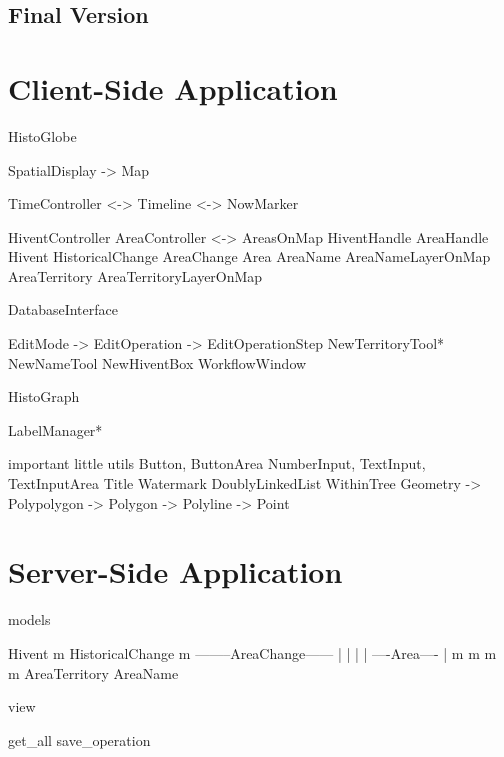 
\subsection{Final Version} %
\label{sub:final_version}




\section{Client-Side Application} %
\label{sec:client_side_application}



HistoGlobe

SpatialDisplay -> Map

TimeController  <-> Timeline
                <-> NowMarker

HiventController                AreaController <->  AreasOnMap
HiventHandle                    AreaHandle
Hivent
HistoricalChange    AreaChange  Area
                                AreaName            AreaNameLayerOnMap
                                AreaTerritory       AreaTerritoryLayerOnMap

DatabaseInterface

EditMode -> EditOperation -> EditOperationStep
NewTerritoryTool* NewNameTool NewHiventBox
WorkflowWindow

HistoGraph

LabelManager*

important little utils
  Button, ButtonArea
  NumberInput, TextInput, TextInputArea
  Title
  Watermark
  DoublyLinkedList
  WithinTree
  Geometry -> Polypolygon -> Polygon -> Polyline -> Point







\section{Server-Side Application} %
\label{sec:server_side_application}

models

           Hivent
             m
       HistoricalChange
             m
  --------AreaChange------
  |          |           |
  |     ----Area----     |
  m     m          m     m
AreaTerritory      AreaName


view

get\_all
save\_operation








